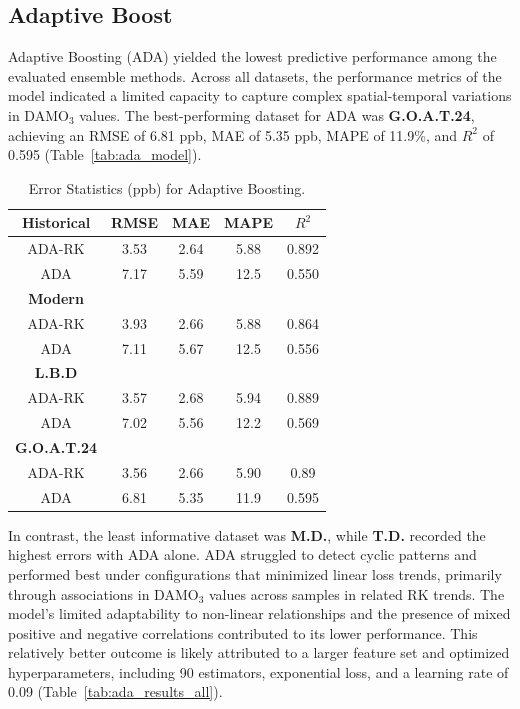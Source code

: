 \subsection{Adaptive Boost} \label{rlts:adaboost} Adaptive Boosting (ADA) yielded the lowest predictive performance among the evaluated ensemble methods. Across all datasets, the performance metrics of the model indicated a limited capacity to capture complex spatial-temporal variations in DAMO$_3$ values. The best-performing dataset for ADA was \textbf{G.O.A.T.24}, achieving an RMSE of 6.81 ppb, MAE of 5.35 ppb, MAPE of 11.9\%, and $R^{2}$ of 0.595 (Table~\ref{tab:ada_model}). \begin{table}[h!]
    \centering
        \begin{tabular}{||c|cccc||}
            \hline
            \textbf{Historical} & \textbf{RMSE} & \textbf{MAE} & \textbf{MAPE} & \textbf{$R^{2}$} \\[3pt]
            \hline
            ADA-RK & 3.53 & 2.64 &  5.88 & 0.892 \\[3pt]
               ADA & 7.17 & 5.59 & 12.5  & 0.550 \\
            \hline
            \textbf{Modern}	&   &   &   &   \\[3pt]
            \hline
             ADA-RK &  3.93 & 2.66 &  5.88 & 0.864 \\[3pt]
                ADA &  7.11 & 5.67 & 12.5  & 0.556 \\
            \hline
            \textbf{L.B.D}	&   &   &   &   \\[3pt]
            \hline
             ADA-RK & 3.57 & 2.68 &  5.94 & 0.889 \\[3pt]
                ADA & 7.02 & 5.56 & 12.2  & 0.569 \\
            \hline
            \textbf{G.O.A.T.24}	&   &   &   &   \\[3pt]
            \hline
             ADA-RK & 3.56 & 2.66 &  5.90 & 0.89 \\[3pt]
                ADA & 6.81 & 5.35 & 11.9  & 0.595 \\
            \hline
        \end{tabular}
    \caption{Error Statistics (ppb) for Adaptive Boosting.} 
    \label{tab:ada_model_error}
\end{table} In contrast, the least informative dataset was \textbf{M.D.}, while \textbf{T.D.} recorded the highest errors with ADA alone. ADA struggled to detect cyclic patterns and performed best under configurations that minimized linear loss trends, primarily through associations in DAMO$_3$ values across samples in related RK trends. The model's limited adaptability to non-linear relationships and the presence of mixed positive and negative correlations contributed to its lower performance. This relatively better outcome is likely attributed to a larger feature set and optimized hyperparameters, including 90 estimators, exponential loss, and a learning rate of 0.09 (Table~\ref{tab:ada_results_all}).
